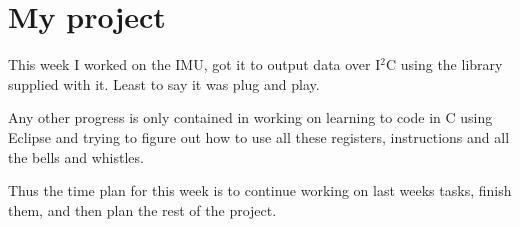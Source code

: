\documentclass[11pt,a4paper,titlepage]{article}
\begin{document}


\section{My project}

This week I worked on the IMU, got it to output data over I$^2$C using the library supplied with it. Least to say it was plug and play.

Any other progress is only contained in working on learning to code in C using Eclipse and trying to figure out how to use all these registers, instructions and all the bells and whistles.

Thus the time plan for this week is to continue working on last weeks tasks, finish them, and then plan the rest of the project.
\end{document}
